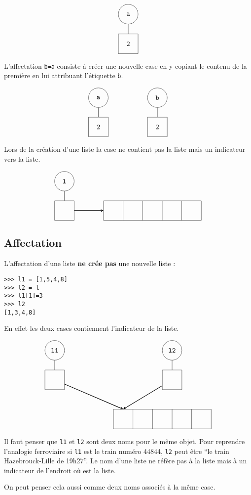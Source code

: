 $$\tikzpicture
 \tikzstyle{every node}=[circle,draw,minimum size =10mm]
 \tikzstyle{level 1}=[sibling distance =6cm]
 \node {\tt a}
      child {node[rectangle]{2}};
\endtikzpicture
$$

L'affectation \lstinline?b=a? consiste à créer une nouvelle case en y copiant le contenu de la première en lui attribuant l'étiquette {\tt b}.

$$\tikzpicture
 \tikzstyle{every node}=[circle,draw,minimum size =10mm]
 \tikzstyle{level 1}=[sibling distance =6cm]
 \node {\tt a}
      child {node[rectangle]{2}};
 \node at (3,0) {\tt b}
      child {node[rectangle]{2}};
\endtikzpicture
$$

Lors de la création d'une liste la case ne contient pas la liste mais un indicateur vers la liste.

$$\tikzpicture
 \tikzstyle{every node}=[circle,draw,minimum size =10mm]
 \tikzstyle{level 1}=[sibling distance =6cm]
 \node {\tt l}
      child {node[rectangle](sl){}};
 \draw (2,-2) grid +(5,1);
 \draw[thick,-stealth] (sl) -- (2,-1.5);
\endtikzpicture
$$

\subsection{Affectation}


L’affectation d’une liste \textbf{ne crée pas} une nouvelle liste :
\begin{lstlisting}
>>> l1 = [1,5,4,8]
>>> l2 = l
>>> l1[1]=3
>>> l2
[1,3,4,8]
\end{lstlisting}

En effet les deux cases contiennent l'indicateur de la liste.

$$\tikzpicture
 \tikzstyle{every node}=[circle,draw,minimum size =10mm]
 \tikzstyle{level 1}=[sibling distance =6cm]
 \node at (-3,0) {\tt l1}
      child {node[rectangle](al){}};
 \draw (0,-4) grid +(5,1);
 \draw[thick,-stealth] (al) -- (0.5,-3);
 \node at (3,0) {\tt l2} 
      child {node[rectangle](all){}};
 \draw[thick,-stealth] (all) -- (0.5,-3);
\endtikzpicture
$$



Il faut penser que \lstinline?l1? et \lstinline?l2? sont deux noms pour le même objet. Pour reprendre l’analogie ferroviaire si \lstinline?l1? est le train numéro 44844, \lstinline?l2? peut être “le train Hazebrouck-Lille de 19h27”. 
Le nom d’une liste ne réfère pas à la liste mais à un indicateur de l’endroit où est la liste.

On peut penser cela aussi comme deux noms associés à la même case.

